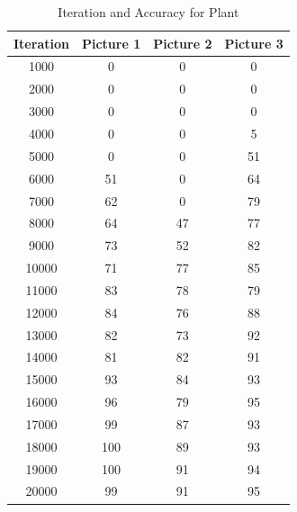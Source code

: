 \begin{table}[h!]
\centering
\begin{tabular}{|c|c|c|c|}
\hline
\textbf{Iteration} & \textbf{Picture 1} & \textbf{Picture 2} & \textbf{Picture 3} \\
\hline
1000 & 0 & 0 & 0 \\
2000 & 0 & 0 & 0 \\
3000 & 0 & 0 & 0 \\
4000 & 0 & 0 & 5 \\
5000 & 0 & 0 & 51 \\
6000 & 51 & 0 & 64 \\
7000 & 62 & 0 & 79 \\
8000 & 64 & 47 & 77 \\
9000 & 73 & 52 & 82 \\
10000 & 71 & 77 & 85 \\
11000 & 83 & 78 & 79 \\
12000 & 84 & 76 & 88 \\
13000 & 82 & 73 & 92 \\
14000 & 81 & 82 & 91 \\
15000 & 93 & 84 & 93 \\
16000 & 96 & 79 & 95 \\
17000 & 99 & 87 & 93 \\
18000 & 100 & 89 & 93 \\
19000 & 100 & 91 & 94 \\
20000 & 99 & 91 & 95 \\
\hline
\end{tabular}
\caption{Iteration and Accuracy for Plant}
\end{table}


